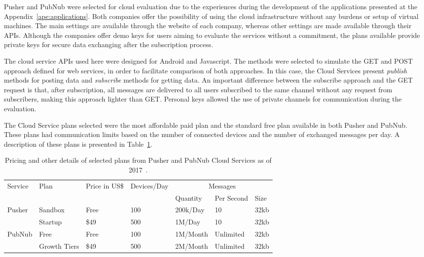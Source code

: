 Pusher and PubNub were selected for cloud evaluation due to  the experiences during the development of the applications presented at the Appendix~\ref{ape:applications}.
Both companies offer the possibility of using the cloud infrastructure without any burdens or setup of virtual machines.
The main settings are available through the website of each company, whereas other settings are made available through their APIs.
Although the companies offer demo keys for users aiming to evaluate the services without a commitment, the plans available provide private keys for secure data exchanging after the subscription process. 

The cloud service APIs used here were designed for Android and Javascript.
The methods were selected to simulate the GET and POST approach defined for web services, in order to facilitate comparison of both approaches.
In this case, the Cloud Services present \emph{publish} methods for posting data and \emph{subscribe} methods for getting data.
An important difference between the subscribe approach and the GET request is that, after subscription, all messages are delivered to all users subscribed to the same channel without any request from subscribers, making this approach lighter than GET. 
Personal keys allowed the use of private channels for communication during the evaluation.

The Cloud Service plans selected were the most affordable paid plan and the standard free plan available in both Pusher and PubNub.
These plans had communication limits based on the number of connected devices and the number of exchanged messages per day.
A description of these plans is presented in Table~\ref{tab:pusherpubnubplans}.


\begin{table}[]
\centering
\caption{Pricing and other details of selected plans from Pusher and PubNub Cloud Services as of 2017~\citep{Pusher2017website,PubNub2017website}.}
\label{tab:pusherpubnubplans}
\begin{tabular}{l|llllll}
Service & Plan         & Price in US\$ & Devices/Day & \multicolumn{3}{c}{Messages} \\ \cline{5-7} 
        &              &               &             & Quantity & Per Second & Size \\ \hline
Pusher  & Sandbox      & Free          & 100         & 200k/Day &    10      & 32kb \\ \cline{2-7} 
        & Startup      & \$49          & 500         & 1M/Day   &    10      & 32kb \\ \hline
PubNub  & Free         & Free          & 100         & 1M/Month & Unlimited  & 32kb \\ \cline{2-7} 
        & Growth Tiers & \$49          & 500         & 2M/Month & Unlimited  & 32kb \\ \hline
\end{tabular}
\end{table}

